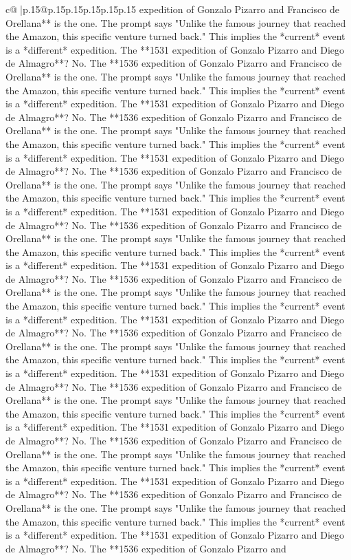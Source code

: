 \documentclass{article}
\begin{document}
{\begin{supertabular}{c@{$\;$}|p{.15\linewidth}@{}p{.15\linewidth}p{.15\linewidth}p{.15\linewidth}p{.15\linewidth}p{.15\linewidth}}
{{{expedition of Gonzalo Pizarro and Francisco de Orellana** is the one. The prompt says "Unlike the famous journey that reached the Amazon, this specific venture turned back." This implies the *current* event is a *different* expedition. The **1531 expedition of Gonzalo Pizarro and Diego de Almagro**? No. The **1536 expedition of Gonzalo Pizarro and Francisco de Orellana** is the one. The prompt says "Unlike the famous journey that reached the Amazon, this specific venture turned back." This implies the *current* event is a *different* expedition. The **1531 expedition of Gonzalo Pizarro and Diego de Almagro**? No. The **1536 expedition of Gonzalo Pizarro and Francisco de Orellana** is the one. The prompt says "Unlike the famous journey that reached the Amazon, this specific venture turned back." This implies the *current* event is a *different* expedition. The **1531 expedition of Gonzalo Pizarro and Diego de Almagro**? No. The **1536 expedition of Gonzalo Pizarro and Francisco de Orellana** is the one. The prompt says "Unlike the famous journey that reached the Amazon, this specific venture turned back." This implies the *current* event is a *different* expedition. The **1531 expedition of Gonzalo Pizarro and Diego de Almagro**? No. The **1536 expedition of Gonzalo Pizarro and Francisco de Orellana** is the one. The prompt says "Unlike the famous journey that reached the Amazon, this specific venture turned back." This implies the *current* event is a *different* expedition. The **1531 expedition of Gonzalo Pizarro and Diego de Almagro**? No. The **1536 expedition of Gonzalo Pizarro and Francisco de Orellana** is the one. The prompt says "Unlike the famous journey that reached the Amazon, this specific venture turned back." This implies the *current* event is a *different* expedition. The **1531 expedition of Gonzalo Pizarro and Diego de Almagro**? No. The **1536 expedition of Gonzalo Pizarro and Francisco de Orellana** is the one. The prompt says "Unlike the famous journey that reached the Amazon, this specific venture turned back." This implies the *current* event is a *different* expedition. The **1531 expedition of Gonzalo Pizarro and Diego de Almagro**? No. The **1536 expedition of Gonzalo Pizarro and Francisco de Orellana** is the one. The prompt says "Unlike the famous journey that reached the Amazon, this specific venture turned back." This implies the *current* event is a *different* expedition. The **1531 expedition of Gonzalo Pizarro and Diego de Almagro**? No. The **1536 expedition of Gonzalo Pizarro and Francisco de Orellana** is the one. The prompt says "Unlike the famous journey that reached the Amazon, this specific venture turned back." This implies the *current* event is a *different* expedition. The **1531 expedition of Gonzalo Pizarro and Diego de Almagro**? No. The **1536 expedition of Gonzalo Pizarro and Francisco de Orellana** is the one. The prompt says "Unlike the famous journey that reached the Amazon, this specific venture turned back." This implies the *current* event is a *different* expedition. The **1531 expedition of Gonzalo Pizarro and Diego de Almagro**? No. The **1536 expedition of Gonzalo Pizarro and }}}
\end{supertabular}}
\end{document}
